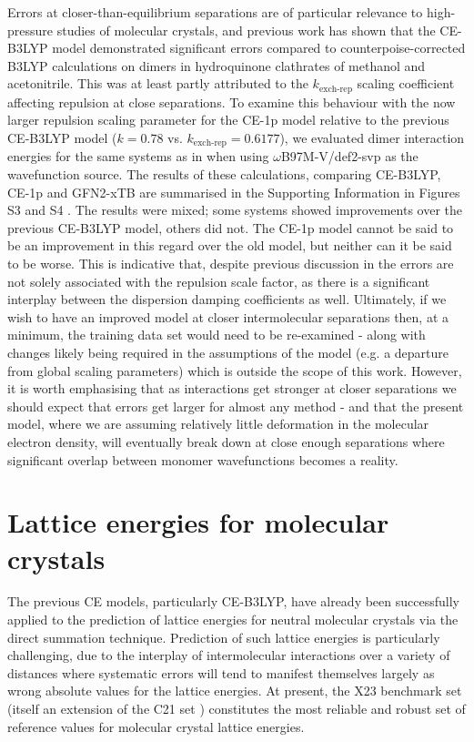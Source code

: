 \documentclass[preprint]{iucr}              %
\begin{document}
Errors at closer-than-equilibrium separations are of particular relevance to high-pressure studies of molecular crystals, and
previous work \cite{Eikeland2017} has shown that the CE-B3LYP model demonstrated significant errors compared to counterpoise-corrected B3LYP 
calculations on dimers in hydroquinone clathrates of methanol and acetonitrile. This was at least partly attributed to 
the $k_\text{exch-rep}$ scaling coefficient affecting repulsion at close separations. To examine this behaviour with the now larger repulsion scaling parameter for the CE-1p model relative to the previous CE-B3LYP model
($k=0.78$ vs. $k_\text{exch-rep}=0.6177$), we evaluated dimer interaction energies for the same
systems as in \cite{Eikeland2017} when using $\omega$B97M-V/def2-svp as the wavefunction source.
The results of these calculations, comparing CE-B3LYP, CE-1p and GFN2-xTB are summarised in the Supporting Information in Figures S3 %
and S4 %
. 
The results were mixed; some systems showed improvements over the previous CE-B3LYP model, others did not. The CE-1p
model cannot be said to be an improvement in this regard over the old model, but neither can it be said to be worse. 
This is indicative that, despite previous discussion in \cite{Eikeland2017} the errors are not solely associated with the repulsion 
scale factor, as there is a significant interplay between the dispersion damping
coefficients as well. Ultimately, if we wish to have an improved model at closer intermolecular separations then, at a minimum, 
the training data set would need to be re-examined - along with changes likely being required in the assumptions of the model
(e.g. a departure from global scaling parameters) which is outside the scope of this work.
However, it is worth emphasising that as interactions get stronger at closer separations we should expect that errors get larger
for almost any method - and that the present model, where we are assuming relatively little deformation in
the molecular electron density, will eventually break down at close enough separations where significant overlap between 
monomer wavefunctions becomes a reality.

\section{Lattice energies for molecular crystals}

The previous CE models, particularly CE-B3LYP, have already been successfully applied to the prediction of lattice energies for
neutral molecular crystals via the direct summation technique. Prediction of such lattice energies is particularly challenging, 
due to the interplay of intermolecular interactions over a 
variety of distances where systematic errors will tend to manifest themselves largely as wrong absolute values for the lattice energies.
At present, the X23 benchmark set \cite{Reilly2013, Dolgonos2019}
(itself an extension of the C21 set \cite{Otero-de-la-Roza2012b}) constitutes the most reliable and robust set of reference values
for molecular crystal lattice energies. 
\end{document}
